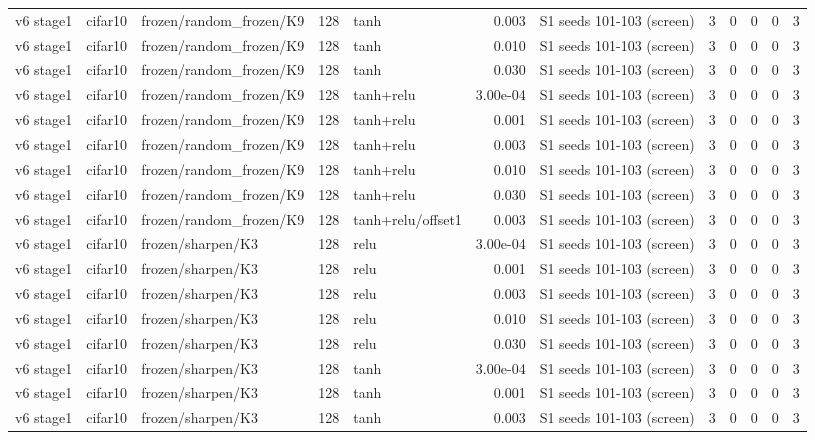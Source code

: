 \begin{table}[htbp]
{\begin{tabular}{@{}lllrlrlrrrrr@{}}
v6 stage1 & cifar10 & frozen/random\_frozen/K9 & 128 & tanh & 0.003 & S1 seeds 101-103 (screen) & 3 & 0 & 0 & 0 & 3 \\
v6 stage1 & cifar10 & frozen/random\_frozen/K9 & 128 & tanh & 0.010 & S1 seeds 101-103 (screen) & 3 & 0 & 0 & 0 & 3 \\
v6 stage1 & cifar10 & frozen/random\_frozen/K9 & 128 & tanh & 0.030 & S1 seeds 101-103 (screen) & 3 & 0 & 0 & 0 & 3 \\
v6 stage1 & cifar10 & frozen/random\_frozen/K9 & 128 & tanh+relu & 3.00e-04 & S1 seeds 101-103 (screen) & 3 & 0 & 0 & 0 & 3 \\
v6 stage1 & cifar10 & frozen/random\_frozen/K9 & 128 & tanh+relu & 0.001 & S1 seeds 101-103 (screen) & 3 & 0 & 0 & 0 & 3 \\
v6 stage1 & cifar10 & frozen/random\_frozen/K9 & 128 & tanh+relu & 0.003 & S1 seeds 101-103 (screen) & 3 & 0 & 0 & 0 & 3 \\
v6 stage1 & cifar10 & frozen/random\_frozen/K9 & 128 & tanh+relu & 0.010 & S1 seeds 101-103 (screen) & 3 & 0 & 0 & 0 & 3 \\
v6 stage1 & cifar10 & frozen/random\_frozen/K9 & 128 & tanh+relu & 0.030 & S1 seeds 101-103 (screen) & 3 & 0 & 0 & 0 & 3 \\
v6 stage1 & cifar10 & frozen/random\_frozen/K9 & 128 & tanh+relu/offset1 & 0.003 & S1 seeds 101-103 (screen) & 3 & 0 & 0 & 0 & 3 \\
v6 stage1 & cifar10 & frozen/sharpen/K3 & 128 & relu & 3.00e-04 & S1 seeds 101-103 (screen) & 3 & 0 & 0 & 0 & 3 \\
v6 stage1 & cifar10 & frozen/sharpen/K3 & 128 & relu & 0.001 & S1 seeds 101-103 (screen) & 3 & 0 & 0 & 0 & 3 \\
v6 stage1 & cifar10 & frozen/sharpen/K3 & 128 & relu & 0.003 & S1 seeds 101-103 (screen) & 3 & 0 & 0 & 0 & 3 \\
v6 stage1 & cifar10 & frozen/sharpen/K3 & 128 & relu & 0.010 & S1 seeds 101-103 (screen) & 3 & 0 & 0 & 0 & 3 \\
v6 stage1 & cifar10 & frozen/sharpen/K3 & 128 & relu & 0.030 & S1 seeds 101-103 (screen) & 3 & 0 & 0 & 0 & 3 \\
v6 stage1 & cifar10 & frozen/sharpen/K3 & 128 & tanh & 3.00e-04 & S1 seeds 101-103 (screen) & 3 & 0 & 0 & 0 & 3 \\
v6 stage1 & cifar10 & frozen/sharpen/K3 & 128 & tanh & 0.001 & S1 seeds 101-103 (screen) & 3 & 0 & 0 & 0 & 3 \\
v6 stage1 & cifar10 & frozen/sharpen/K3 & 128 & tanh & 0.003 & S1 seeds 101-103 (screen) & 3 & 0 & 0 & 0 & 3 \\

\end{tabular}}
\end{table}
